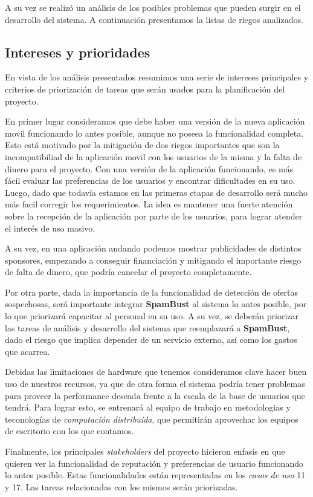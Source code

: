 \documentclass[10pt, a4paper]{article}
\begin{document}
A su vez se realizó un análisis de los posibles problemas que pueden surgir en el desarrollo del sistema. A continuación presentamos la listas de riegos analizados.



\subsection{Intereses y prioridades}

En vista de los análisis presentados resumimos una serie de intereses principales y criterios de priorización de tareas que serán usados para la planificación del proyecto. 

En primer lugar consideramos que debe haber una versión de la nueva aplicación movil funcionando lo antes posible, aunque no poseea la funcionalidad completa. Esto está motivado por la mitigación de dos riegos importantes que son la incompatibiliad de la aplicación movil con los usuarios de la misma y la falta de dinero para el proyecto. Con una versión de la aplicación funcionando, es más fácil evaluar las preferencias de los usuarios y encontrar dificultades en su uso. Luego, dado que todavía estamos en las primeras etapas de desarrollo será mucho más facil corregir los requerimientos. La idea es mantener una fuerte atención sobre la recepción de la aplicación por parte de los usuarios, para lograr atender el interés de uso masivo.

A su vez, en una aplicación andando podemos mostrar publicidades de distintos sponsores, empezando a conseguir financiación y mitigando el importante riesgo de falta de dinero, que podría cancelar el proyecto completamente.

Por otra parte, dada la importancia de la funcionalidad de detección de ofertas sospechosas, será importante integrar \textbf{SpamBust} al sistema lo antes posible, por lo que priorizará capacitar al personal en su uso. A su vez, se deberán priorizar las tareas de análisis y desarrollo del sistema que reemplazará a \textbf{SpamBust}, dado el riesgo que implica depender de un servicio externo, así como los gastos que acarrea. 

Debidas las limitaciones de hardware que tenemos consideramos clave hacer buen uso de nuestros recursos, ya que de otra forma el sistema podría tener problemas para proveer la performance deseada frente a la escala de la base de usuarios que tendrá. Para lograr esto, se entrenará al equipo de trabajo en metodologias y teconologías de \emph{computación distribuída}, que permitirán aprovechar los equipos de escritorio con los que contamos. 

Finalmente, los principales \emph{stakeholders} del proyecto hicieron enfasís en que quieren ver la funcionalidad de reputación y preferencias de usuario funcionando lo antes posible. Estas funcionalidades están representadas en los \emph{casos de uso} 11 y 17. Las tareas relacionadas con los mismos serán priorizadas.
\end{document}
